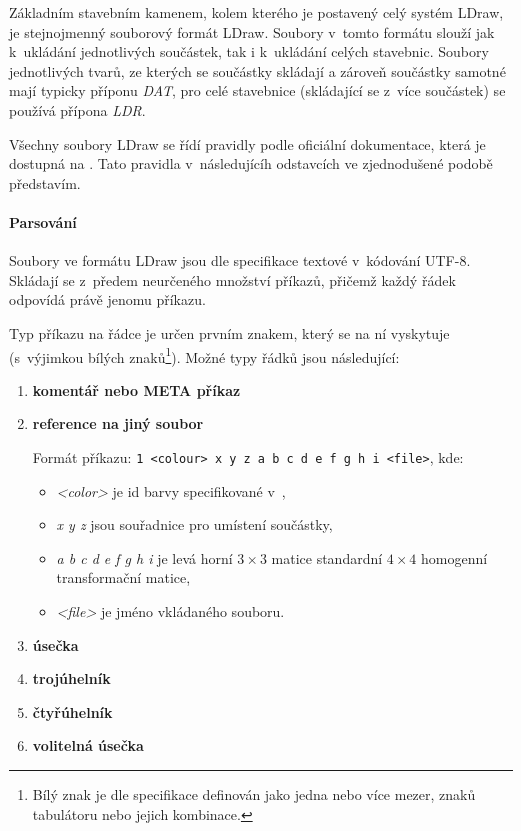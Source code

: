     Základním stavebním kamenem, kolem kterého je postavený celý systém LDraw, je stejnojmenný souborový formát LDraw. Soubory v~tomto formátu slouží jak k~ukládání jednotlivých součástek, tak i k~ukládání celých stavebnic. Soubory jednotlivých tvarů, ze kterých se součástky skládají a zároveň součástky samotné mají typicky příponu \textit{DAT}, pro celé stavebnice (skládající se z~více součástek) se používá přípona \textit{LDR}.
    
    Všechny soubory LDraw se řídí pravidly podle oficiální dokumentace, která je dostupná na \autocite{ldraw:file:documentation}. Tato pravidla v~následujícíh odstavcích ve zjednodušené podobě představím.

        \paragraph{Parsování}\mbox{}

        Soubory ve formátu LDraw jsou dle specifikace \autocite{ldraw:file:specification} textové v~kódování \gls{UTF-8}. Skládají se z~předem neurčeného množství příkazů, přičemž každý řádek odpovídá právě jenomu příkazu.

        Typ příkazu na řádce je určen prvním znakem, který se na ní vyskytuje (s~výjimkou bílých znaků\footnote{Bílý znak je dle specifikace \autocite{ldraw:file:specification} definován jako jedna nebo více mezer, znaků tabulátoru nebo jejich kombinace.}). Možné typy řádků jsou následující: 
        
        \begin{enumerate}
            \item[0:] \textbf{komentář nebo META příkaz}

            \item[1:] \textbf{reference na jiný soubor}

                Formát příkazu: \texttt{1 <colour> x y z~a b c d e f g h i <file>}, kde: 
                \begin{itemize}
                    \item \textit{<color>} je id barvy specifikované v~\autocite{ldraw:colors},
                    \item \textit{x y z} jsou souřadnice pro umístení součástky,
                    \item \textit{a b c d e f g h i} je levá horní $ 3\times3 $ matice standardní $ 4\times4 $ homogenní transformační matice,
                    \item \textit{<file>} je jméno vkládaného souboru.
                \end{itemize}
                
            \item[2:] \textbf{úsečka}
            \item[3:] \textbf{trojúhelník}
            \item[4:] \textbf{čtyřúhelník}
            \item[5:] \textbf{volitelná úsečka}
        \end{enumerate}

